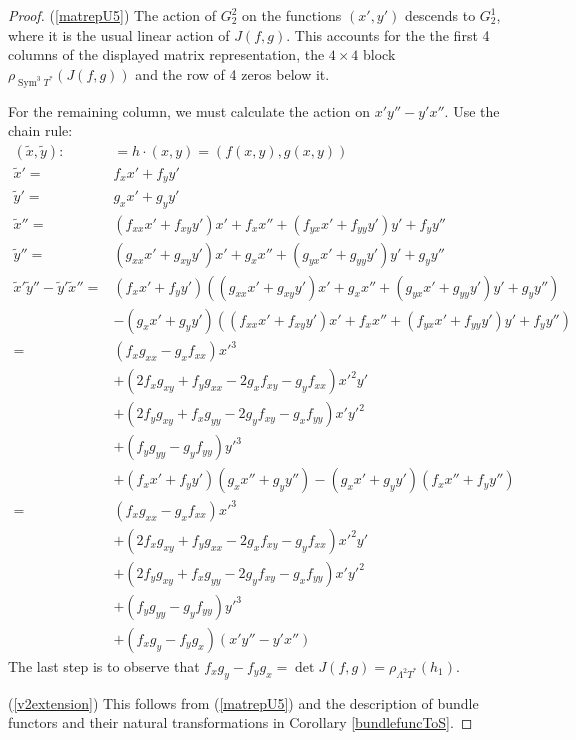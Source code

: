 \documentclass[12pt]{article}
\numberwithin{equation}{section}
\newcounter{count}
\theoremstyle{plain}
\theoremstyle{definition}
\renewcommand{\L}{\Lambda}
\begin{document}
\begin{proof}
(\ref{matrepU5}) The action of $G^{2}_{2}$ on the functions $(x',y')$ descends to $G^{1}_{2}$, where it is the usual linear action of $J(f,g)$. This accounts for the the first 4 columns of the displayed matrix representation, the $4\times 4$ block $\rho_{\operatorname{Sym}^{3}T^{*}}(J(f,g))$ and the row of 4 zeros below it.

For the remaining column, we must calculate the action on $x'y''-y'x''$. Use the chain rule:
\begin{align*}
(\tilde{x},\tilde{y}):&=h\cdot (x,y) = (f(x,y),g(x,y))\\
\tilde{x}'=&f_{x}x'+f_{y}y'\\
\tilde{y}'=&g_{x}x'+g_{y}y'\\
\tilde{x}''=&(f_{xx}x'+f_{xy}y')x'+f_{x}x'' + (f_{yx}x'+f_{yy}y')y'+f_{y}y''\\
\tilde{y}''=&(g_{xx}x'+g_{xy}y')x'+g_{x}x'' + (g_{yx}x'+g_{yy}y')y'+g_{y}y''\\
\tilde{x}'\tilde{y}''-\tilde{y}'\tilde{x}''=&(f_{x}x'+f_{y}y')((g_{xx}x'+g_{xy}y')x'+g_{x}x'' + (g_{yx}x'+g_{yy}y')y'+g_{y}y'')\\
&-(g_{x}x'+g_{y}y')((f_{xx}x'+f_{xy}y')x'+f_{x}x'' + (f_{yx}x'+f_{yy}y')y'+f_{y}y'')\\
=&(f_{x}g_{xx}-g_{x}f_{xx})x'^{3}\\
&+(2f_{x}g_{xy}+f_{y}g_{xx}-2g_{x}f_{xy}-g_{y}f_{xx})x'^{2}y'\\
&+(2f_{y}g_{xy}+f_{x}g_{yy}-2g_{y}f_{xy}-g_{x}f_{yy})x'y'^{2}\\
&+(f_{y}g_{yy}-g_{y}f_{yy})y'^{3}\\
&+(f_{x}x'+f_{y}y')(g_{x}x''+g_{y}y'')-(g_{x}x'+g_{y}y')(f_{x}x''+f_{y}y'')\\
=&(f_{x}g_{xx}-g_{x}f_{xx})x'^{3}\\
&+(2f_{x}g_{xy}+f_{y}g_{xx}-2g_{x}f_{xy}-g_{y}f_{xx})x'^{2}y'\\
&+(2f_{y}g_{xy}+f_{x}g_{yy}-2g_{y}f_{xy}-g_{x}f_{yy})x'y'^{2}\\
&+(f_{y}g_{yy}-g_{y}f_{yy})y'^{3}\\
&+(f_{x}g_{y}-f_{y}g_{x})(x'y''-y'x'')
\end{align*}
The last step is to observe that $f_{x}g_{y}-f_{y}g_{x}=\operatorname{det}J(f,g)=\rho_{\L^{2}T^{*}}(h_1)$.

(\ref{v2extension}) This follows from (\ref{matrepU5}) and the description of bundle functors and their natural transformations in Corollary \ref{bundlefuncToS}.


\end{proof}
\end{document}
